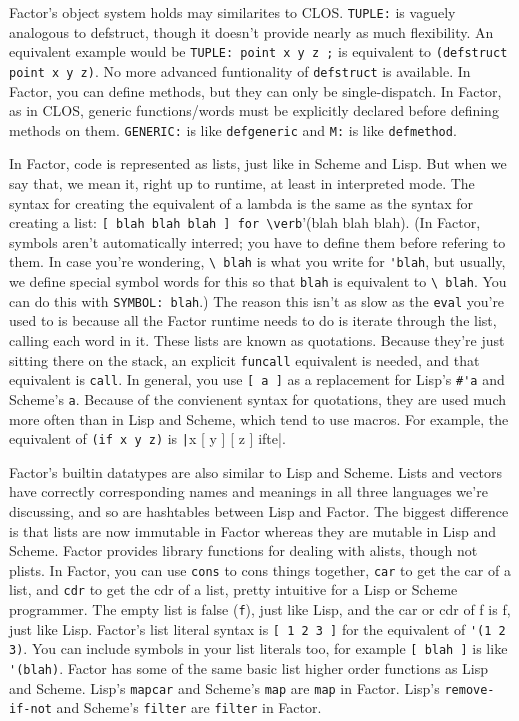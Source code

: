 \documentclass{article}
\begin{document}
Factor's object system holds may similarites to CLOS. \texttt{TUPLE:} is vaguely analogous to defstruct, though it doesn't provide nearly as much flexibility. An equivalent example would be \verb|TUPLE: point x y z ;| is equivalent to \verb|(defstruct point x y z)|. No more advanced funtionality of \texttt{defstruct} is available. In Factor, you can define methods, but they can only be single-dispatch. In Factor, as in CLOS, generic functions/words must be explicitly declared before defining methods on them. \texttt{GENERIC:} is like \texttt{defgeneric} and \texttt{M:} is like \texttt{defmethod}. 

In Factor, code is represented as lists, just like in Scheme and Lisp. But when we say that, we mean it, right up to runtime, at least in interpreted mode. The syntax for creating the equivalent of a lambda is the same as the syntax for creating a list: \verb|[ blah blah blah ] for \verb|'(blah blah blah). (In Factor, symbols aren't automatically interred; you have to define them before refering to them. In case you're wondering, \verb|\ blah| is what you write for \verb|'blah|, but usually, we define special symbol words for this so that \verb|blah| is equivalent to \verb|\ blah|. You can do this with \verb|SYMBOL: blah|.) The reason this isn't as slow as the \texttt{eval} you're used to is because all the Factor runtime needs to do is iterate through the list, calling each word in it. These lists are known as quotations. Because they're just sitting there on the stack, an explicit \texttt{funcall} equivalent is needed, and that equivalent is \texttt{call}. In general, you use \verb|[ a ]| as a replacement for Lisp's \verb|#'a| and Scheme's \verb|a|. Because of the convienent syntax for quotations, they are used much more often than in Lisp and Scheme, which tend to use macros. For example, the equivalent of \verb|(if x y z)| is \texttt|x [ y ] [ z ] ifte|.

Factor's builtin datatypes are also similar to Lisp and Scheme. Lists and vectors have correctly corresponding names and meanings in all three languages we're discussing, and so are hashtables between Lisp and Factor. The biggest difference is that lists are now immutable in Factor whereas they are mutable in Lisp and Scheme. Factor provides library functions for dealing with alists, though not plists. In Factor, you can use \texttt{cons} to cons things together, \texttt{car} to get the car of a list, and \texttt{cdr} to get the cdr of a list, pretty intuitive for a Lisp or Scheme programmer. The empty list is false (\texttt{f}), just like Lisp, and the car or cdr of f is f, just like Lisp. Factor's list literal syntax is \verb|[ 1 2 3 ]| for the equivalent of \verb|'(1 2 3)|. You can include symbols in your list literals too, for example \verb|[ blah ]| is like \verb|'(blah)|. Factor has some of the same basic list higher order functions as Lisp and Scheme. Lisp's \texttt{mapcar} and Scheme's \texttt{map} are \texttt{map} in Factor. Lisp's \texttt{remove-if-not} and Scheme's \texttt{filter} are \texttt{filter} in Factor.
\end{document}
